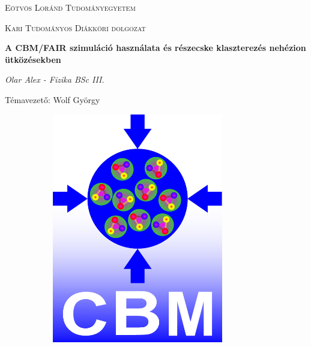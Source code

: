 \documentclass[12pt,a4paper]{report}
\begin{document}
\begin{titlepage}
	\centering
	{\scshape\LARGE Eötvös Loránd Tudományegyetem \par}
	\vspace{1cm}
	{\scshape\Large Kari Tudományos Diákköri dolgozat \par}
	\vspace{1.5cm}
	{\huge\bfseries A CBM/FAIR szimuláció használata és részecske klaszterezés nehézion ütközésekben\par}
	\vspace{2cm}
	{\Large\itshape Olar Alex - Fizika BSc III.\par}
	\vfill
	{\large Témavezető: Wolf György\par} 
	\begin{figure}[H]
	\centering
	\begin{subfigure}{.39\textwidth}
		\includegraphics[width=0.82\textwidth]{gsi.png}
	\end{subfigure}
	\begin{subfigure}{.39\textwidth}

\end{subfigure}
\end{figure}
\end{titlepage}
\end{document}
